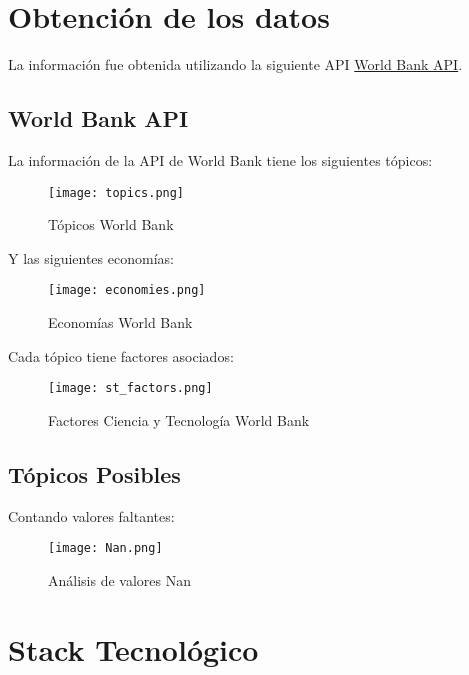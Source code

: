 \documentclass{other/docTemplate}
\begin{document}
\clearpage
\section{Obtención de los datos}
La información fue obtenida utilizando la siguiente API \href{https://datahelpdesk.worldbank.org/knowledgebase/topics/125589}{World Bank API}.


\subsection{World Bank API}

La información de la API de World Bank tiene los siguientes tópicos:

\begin{figure}[htbp!]
  \centering
  \texttt{[image: topics.png]}
  \caption{Tópicos World Bank}
  \label{fig:topics}
\end{figure}

\newpage

Y las siguientes economías:

\begin{figure}[htbp!]
  \centering
  \texttt{[image: economies.png]}
  \caption{Economías World Bank}
  \label{fig:economies}
\end{figure}

Cada tópico tiene factores asociados:

\begin{figure}[htbp!]
  \centering
  \texttt{[image: st\_factors.png]}
  \caption{Factores Ciencia y Tecnología World Bank}
  \label{fig:stfactors}
\end{figure}


\subsection{Tópicos Posibles}

Contando valores faltantes:

\begin{figure}[htbp!]
  \centering
  \texttt{[image: Nan.png]}
  \caption{Análisis de valores Nan}
  \label{fig:nan}
\end{figure}

\clearpage
\section{Stack Tecnológico} 
\end{document}
